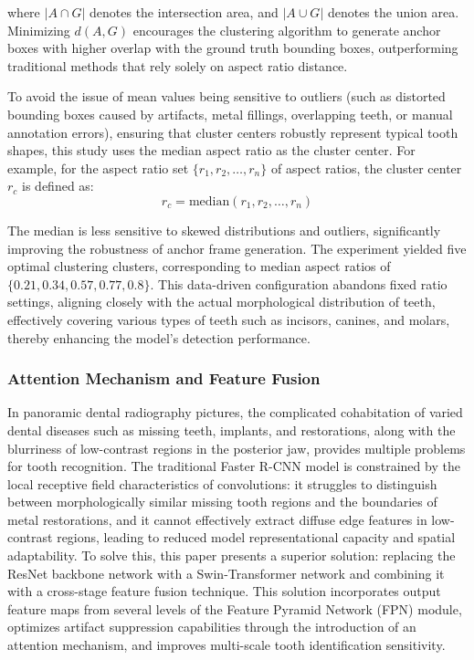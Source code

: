 \documentclass[pdflatex,sn-mathphys-num]{sn-jnl}%
\theoremstyle{thmstyleone}%
\theoremstyle{thmstyletwo}%
\theoremstyle{thmstylethree}%
\begin{document}
where $|A \cap G|$ denotes the intersection area, and $|A \cup G|$ denotes the union area. Minimizing \(d(A,G)\) encourages the clustering algorithm to generate anchor boxes with higher overlap with the ground truth bounding boxes, outperforming traditional methods that rely solely on aspect ratio distance.

To avoid the issue of mean values being sensitive to outliers (such as distorted bounding boxes caused by artifacts, metal fillings, overlapping teeth, or manual annotation errors), ensuring that cluster centers robustly represent typical tooth shapes, this study uses the median aspect ratio as the cluster center. For example, for the aspect ratio set $\{r_1, r_2, \dots, r_n\}$ of aspect ratios, the cluster center $r_c$ is defined as:
\begin{equation}
r_c=\text{median}(r_1, r_2, \dots, r_n)
\end{equation}

The median is less sensitive to skewed distributions and outliers, significantly improving the robustness of anchor frame generation. The experiment yielded five optimal clustering clusters, corresponding to median aspect ratios of $\{0.21, 0.34, 0.57, 0.77, 0.8\}$. This data-driven configuration abandons fixed ratio settings, aligning closely with the actual morphological distribution of teeth, effectively covering various types of teeth such as incisors, canines, and molars, thereby enhancing the model's detection performance.

\subsubsection{Attention Mechanism and Feature Fusion}

In panoramic dental radiography pictures, the complicated cohabitation of varied dental diseases such as missing teeth, implants, and restorations, along with the blurriness of low-contrast regions in the posterior jaw, provides multiple problems for tooth recognition.  The traditional Faster R-CNN model is constrained by the local receptive field characteristics of convolutions: it struggles to distinguish between morphologically similar missing tooth regions and the boundaries of metal restorations, and it cannot effectively extract diffuse edge features in low-contrast regions, leading to reduced model representational capacity and spatial adaptability.  To solve this, this paper presents a superior solution: replacing the ResNet backbone network with a Swin-Transformer network and combining it with a cross-stage feature fusion technique.  This solution incorporates output feature maps from several levels of the Feature Pyramid Network (FPN) module, optimizes artifact suppression capabilities through the introduction of an attention mechanism, and improves multi-scale tooth identification sensitivity.
\end{document}
